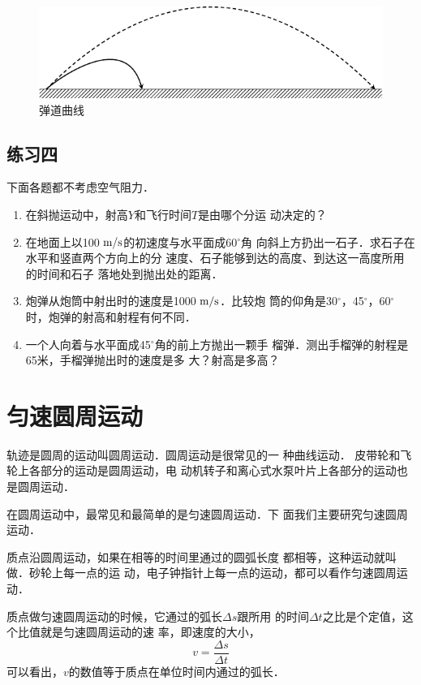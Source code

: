\begin{figure}[htbp]
    \centering
    \includegraphics{fig/A/4-15.pdf}
    \caption{弹道曲线}\label{fig_A_4-15}
\end{figure}

\subsection*{练习四}
    下面各题都不考虑空气阻力．
\begin{enumerate}
 \item 在斜抛运动中，射高$Y$和飞行时间$T$是由哪个分运
动决定的？
 \item 在地面上以100$\;\text{m}/\text{s}$的初速度与水平面成60$^\circ$角
向斜上方扔出一石子．求石子在水平和竖直两个方向上的分
速度、石子能够到达的高度、到达这一高度所用的时间和石子
落地处到抛出处的距离．
  \item 炮弹从炮筒中射出时的速度是1000$\;\text{m}/\text{s}$．比较炮
筒的仰角是30$^\circ$，45$^\circ$，60$^\circ$时，炮弹的射高和射程有何不同．
  \item 一个人向着与水平面成45$^\circ$角的前上方抛出一颗手
榴弹．测出手榴弹的射程是65米，手榴弹抛出时的速度是多
大？射高是多高？
\end{enumerate}

\section{匀速圆周运动}
    轨迹是圆周的运动叫圆周运动．圆周运动是很常见的一
种曲线运动．
皮带轮和飞轮上各部分的运动是圆周运动，电
动机转子和离心式水泵叶片上各部分的运动也是圆周运动．

    在圆周运动中，最常见和最简单的是匀速圆周运动．下
面我们主要研究匀速圆周运动．

    质点沿圆周运动，如果在相等的时间里通过的圆弧长度
都相等，这种运动就叫做．砂轮上每一点的运
动，电子钟指针上每一点的运动，都可以看作匀速圆周运动．

    质点做匀速圆周运动的时候，它通过的弧长$\Delta s$跟所用
的时间$\Delta t$之比是个定值，这个比值就是匀速圆周运动的速
率，即速度的大小，
\[v=\frac{\Delta s}{\Delta t} \]
可以看出，$v$的数值等于质点在单位时间内通过的弧长．

